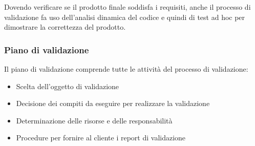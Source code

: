 \documentclass[../norme-di-progetto.tex]{subfiles}
\begin{document}
Dovendo verificare se il prodotto finale soddisfa i requisiti, anche il processo di validazione fa uso dell'analisi dinamica del codice e quindi di test ad hoc per dimostrare la correttezza del prodotto.

\subsubsection{Piano di validazione}%
\label{subs:piano di validazione}

Il piano di validazione comprende tutte le attività del processo di validazione:

\begin{itemize}
  \item Scelta dell'oggetto di validazione
  \item Decisione dei compiti da eseguire per realizzare la validazione
  \item Determinazione delle risorse e delle responsabilità
  \item Procedure per fornire al cliente i report di validazione
\end{itemize}
\end{document}
